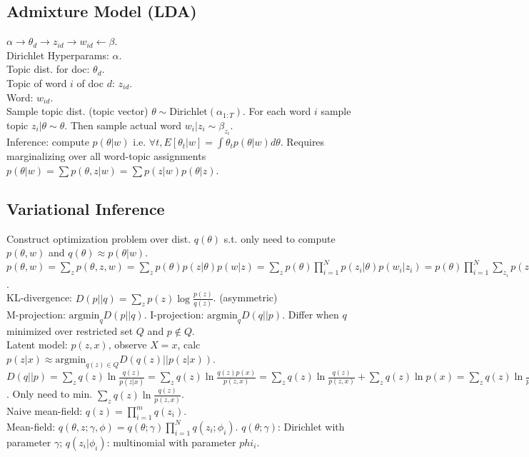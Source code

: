 \subsection*{Admixture Model (LDA)}

$\alpha \rightarrow \theta_d \rightarrow z_{id} \rightarrow w_{id} \leftarrow \beta$.\\
Dirichlet Hyperparams: $\alpha$.\\
Topic dist. for doc: $\theta_d$.\\
Topic of word $i$ of doc $d$: $z_{id}$.\\
Word: $w_{id}$.\\
Sample topic dist. (topic vector) $\theta \sim \text{Dirichlet}(\alpha_{1:T})$. For each word $i$ sample topic $z_i | \theta \sim \theta$. Then sample actual word $w_i | z_i \sim \beta_{z_i}$.\\
Inference: compute $p(\theta|w)$ i.e. $\forall t, E[\theta_t | w] = \int \theta_t p(\theta|w) d\theta$. Requires marginalizing over all word-topic assignments $p(\theta|w) = \sum p(\theta,z|w) = \sum p(z|w)p(\theta|z)$.\\

\subsection*{Variational Inference}

Construct optimization problem over dist. $q(\theta)$ s.t. only need to compute $p(\theta, w)$ and $q(\theta) \approx p(\theta|w)$.\\
$p(\theta, w) = \sum_z p(\theta,z,w) = \sum_z p(\theta) p(z|\theta) p(w|z) = \sum_z p(\theta) \prod_{i=1}^N p(z_i|\theta) p(w_i|z_i) = p(\theta) \prod_{i=1}^N \sum_{z_i} p(z_i|\theta) p(w_i|z_i)$.\\
KL-divergence: $D(p||q) = \sum_z p(z)\log\frac{p(z)}{q(z)}$. (asymmetric)\\
M-projection: $\text{argmin}_q D(p||q)$. I-projection: $\text{argmin}_q D(q||p)$. Differ when $q$ minimized over restricted set $Q$ and $p\not\in Q$.\\
Latent model: $p(z, x)$, observe $X=x$, calc $p(z|x) \approx \text{argmin}_{q(z) \in Q} D(q(z)||p(z|x))$.\\
$D(q||p) = \sum_z q(z)\ln \frac{q(z)}{p(z|x)} = \sum_z q(z)\ln\frac{q(z)p(x)}{p(z,x)} = \sum_z q(z)\ln\frac{q(z)}{p(z,x)}+\sum_z q(z)\ln p(x) = \sum_z q(z)\ln\frac{q(z)}{p(z,x)}+\ln p(x)$. Only need to min. $\sum_z q(z)\ln\frac{q(z)}{p(z,x)}$.\\
Naive mean-field: $q(z) = \prod_{i=1}^m q(z_i)$.\\
Mean-field: $q(\theta, z; \gamma, \phi) = q(\theta; \gamma) \prod_{i=1}^N q(z_i; \phi_i)$. $q(\theta; \gamma)$: Dirichlet with parameter $\gamma$; $q(z_i | \phi_i)$: multinomial with parameter $phi_i$.\\


